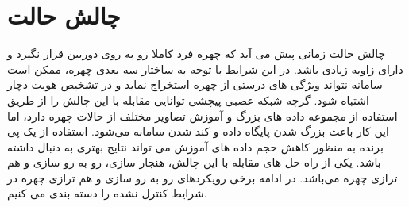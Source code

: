 \section{چالش حالت}
چالش حالت زمانی پیش می آید که چهره فرد کاملا رو به روی دوربین قرار نگیرد و دارای زاویه زیادی باشد. در این شرایط با توجه به ساختار سه بعدی چهره، ممکن است سامانه نتواند ویژگی های درستی از چهره استخراج نماید و در تشخیص هویت دچار اشتباه شود. گرچه شبکه عصبی پیچشی توانایی مقابله با این چالش را از طریق استفاده از مجموعه داده های بزرگ و آموزش تصاویر مختلف از حالات چهره دارد، اما این کار باعث بزرگ شدن پایگاه داده و کند شدن سامانه می‌شود. استفاده از یک پی برنده  به منظور کاهش حجم داده های آموزش می تواند نتایج بهتری به دنبال داشته باشد. یکی از راه  حل های مقابله با این چالش، هنجار سازی، رو به رو سازی  و هم ترازی  چهره می‌باشد. در ادامه برخی رویکردهای رو به رو سازی و هم ترازی چهره در شرایط کنترل نشده را دسته بندی می کنیم.

